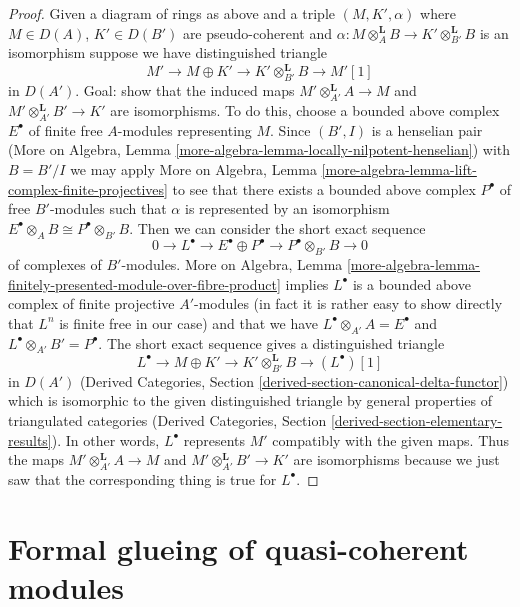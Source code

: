 \begin{proof}
\medskip\noindent
Given a diagram of rings as above and a triple
$(M, K', \alpha)$ where $M \in D(A)$, $K' \in D(B')$ are
pseudo-coherent and
$\alpha : M \otimes_A^\mathbf{L} B \to K' \otimes_{B'}^\mathbf{L} B$
is an isomorphism suppose we have distinguished triangle
$$
M' \to M \oplus K' \to K' \otimes_{B'}^\mathbf{L} B \to M'[1]
$$
in $D(A')$. Goal: show that the induced maps
$M' \otimes_{A'}^\mathbf{L} A \to M$ and
$M' \otimes_{A'}^\mathbf{L} B' \to K'$ are isomorphisms.
To do this, choose a bounded above complex
$E^\bullet$ of finite free $A$-modules representing $M$.
Since $(B', I)$ is a henselian pair
(More on Algebra, Lemma \ref{more-algebra-lemma-locally-nilpotent-henselian})
with $B = B'/I$ we may apply More on Algebra, Lemma
\ref{more-algebra-lemma-lift-complex-finite-projectives}
to see that there exists a bounded above complex $P^\bullet$
of free $B'$-modules such that $\alpha$ is represented
by an isomorphism $E^\bullet \otimes_A B \cong P^\bullet \otimes_{B'} B$.
Then we can consider the short exact sequence
$$
0 \to L^\bullet \to
E^\bullet \oplus P^\bullet \to P^\bullet \otimes_{B'} B \to 0
$$
of complexes of $B'$-modules.
More on Algebra, Lemma
\ref{more-algebra-lemma-finitely-presented-module-over-fibre-product}
implies $L^\bullet$ is a bounded above complex of
finite projective $A'$-modules
(in fact it is rather easy to show directly that $L^n$ is finite free
in our case) and that we have
$L^\bullet \otimes_{A'} A = E^\bullet$ and
$L^\bullet \otimes_{A'} B' = P^\bullet$.
The short exact sequence gives a distinguished triangle
$$
L^\bullet \to M \oplus K' \to K' \otimes_{B'}^\mathbf{L} B \to (L^\bullet)[1]
$$
in $D(A')$ (Derived Categories, Section
\ref{derived-section-canonical-delta-functor}) which is isomorphic
to the given distinguished triangle by general properties of
triangulated categories (Derived Categories, Section
\ref{derived-section-elementary-results}). In other words, $L^\bullet$
represents $M'$ compatibly with the given maps. Thus the maps
$M' \otimes_{A'}^\mathbf{L} A \to M$ and
$M' \otimes_{A'}^\mathbf{L} B' \to K'$ are
isomorphisms because we just saw that the corresponding
thing is true for $L^\bullet$.
\end{proof}











\section{Formal glueing of quasi-coherent modules}
\label{section-formal-glueing}

